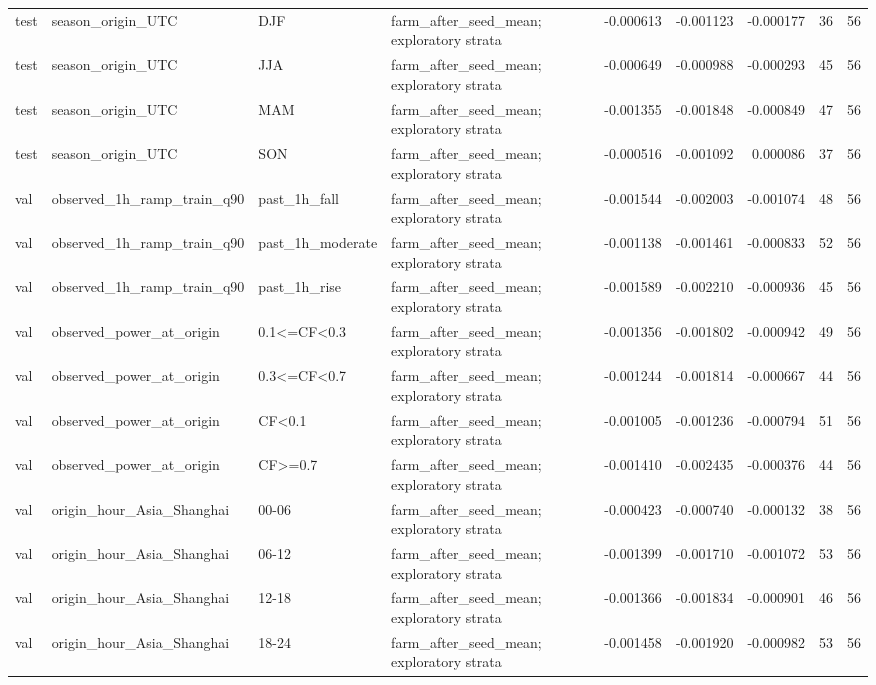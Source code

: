 \begin{tabular}{llllrrrrr}
test & season\_origin\_UTC & DJF & farm\_after\_seed\_mean; exploratory strata & -0.000613 & -0.001123 & -0.000177 & 36 & 56 \\
test & season\_origin\_UTC & JJA & farm\_after\_seed\_mean; exploratory strata & -0.000649 & -0.000988 & -0.000293 & 45 & 56 \\
test & season\_origin\_UTC & MAM & farm\_after\_seed\_mean; exploratory strata & -0.001355 & -0.001848 & -0.000849 & 47 & 56 \\
test & season\_origin\_UTC & SON & farm\_after\_seed\_mean; exploratory strata & -0.000516 & -0.001092 & 0.000086 & 37 & 56 \\
val & observed\_1h\_ramp\_train\_q90 & past\_1h\_fall & farm\_after\_seed\_mean; exploratory strata & -0.001544 & -0.002003 & -0.001074 & 48 & 56 \\
val & observed\_1h\_ramp\_train\_q90 & past\_1h\_moderate & farm\_after\_seed\_mean; exploratory strata & -0.001138 & -0.001461 & -0.000833 & 52 & 56 \\
val & observed\_1h\_ramp\_train\_q90 & past\_1h\_rise & farm\_after\_seed\_mean; exploratory strata & -0.001589 & -0.002210 & -0.000936 & 45 & 56 \\
val & observed\_power\_at\_origin & 0.1<=CF<0.3 & farm\_after\_seed\_mean; exploratory strata & -0.001356 & -0.001802 & -0.000942 & 49 & 56 \\
val & observed\_power\_at\_origin & 0.3<=CF<0.7 & farm\_after\_seed\_mean; exploratory strata & -0.001244 & -0.001814 & -0.000667 & 44 & 56 \\
val & observed\_power\_at\_origin & CF<0.1 & farm\_after\_seed\_mean; exploratory strata & -0.001005 & -0.001236 & -0.000794 & 51 & 56 \\
val & observed\_power\_at\_origin & CF>=0.7 & farm\_after\_seed\_mean; exploratory strata & -0.001410 & -0.002435 & -0.000376 & 44 & 56 \\
val & origin\_hour\_Asia\_Shanghai & 00-06 & farm\_after\_seed\_mean; exploratory strata & -0.000423 & -0.000740 & -0.000132 & 38 & 56 \\
val & origin\_hour\_Asia\_Shanghai & 06-12 & farm\_after\_seed\_mean; exploratory strata & -0.001399 & -0.001710 & -0.001072 & 53 & 56 \\
val & origin\_hour\_Asia\_Shanghai & 12-18 & farm\_after\_seed\_mean; exploratory strata & -0.001366 & -0.001834 & -0.000901 & 46 & 56 \\
val & origin\_hour\_Asia\_Shanghai & 18-24 & farm\_after\_seed\_mean; exploratory strata & -0.001458 & -0.001920 & -0.000982 & 53 & 56 \\

\end{tabular}
